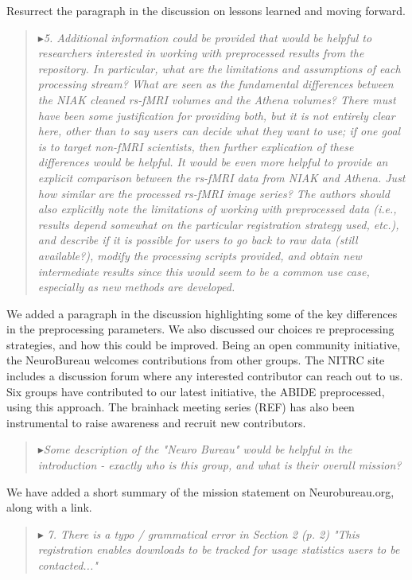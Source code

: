 \documentclass[authoryear,3p]{elsarticle}
\begin{document}
Resurrect the paragraph in the discussion on lessons learned and moving forward. 

\begin{quote}
$\blacktriangleright$\emph{5. Additional information could be provided that would be helpful to researchers interested in working with preprocessed results from the repository. In particular, what are the limitations and assumptions of each processing stream?  What are seen as the fundamental differences between the NIAK cleaned rs-fMRI volumes and the Athena volumes? There must have been some justification for providing both, but it is not entirely clear here, other than to say users can decide what they want to use; if one goal is to target non-fMRI scientists, then further explication of these differences would be helpful. It would be even more helpful to provide an explicit comparison between the rs-fMRI data from NIAK and Athena.  Just how similar are the processed rs-fMRI image series?  The authors should also explicitly note the limitations of working with preprocessed data (i.e., results depend somewhat on the particular registration strategy used, etc.), and describe if it is possible for users
to go back to raw data (still available?), modify the processing scripts provided, and obtain new intermediate results since this would seem to be a common use case, especially as new methods are developed.
}
\end{quote}

We added a paragraph in the discussion highlighting some of the key differences in the preprocessing parameters. We also discussed our choices re preprocessing strategies, and how this could be improved. Being an open community initiative, the NeuroBureau welcomes contributions from other groups. The NITRC site includes a discussion forum where any interested contributor can reach out to us. Six groups have contributed to our latest initiative, the ABIDE preprocessed, using this approach. The brainhack meeting series (REF) has also been instrumental to raise awareness and recruit new contributors.  

\begin{quote}
$\blacktriangleright$\emph{Some description of the "Neuro Bureau" would be helpful in the introduction - exactly who is this group, and what is their overall mission?
}
\end{quote}

We have added a short summary of the mission statement on Neurobureau.org, along with a link.  

\begin{quote}
$\blacktriangleright$\emph{ 7. There is a typo / grammatical error in Section 2 (p. 2) "This registration enables downloads to be tracked for usage statistics users to be contacted..."
}
\end{quote}
\end{document}
